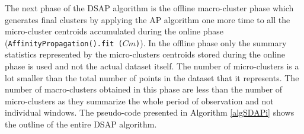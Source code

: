 \documentclass[../UNBThesis2.tex]{subfiles}
\begin{document}
The next phase of the DSAP algorithm is the offline macro-cluster phase which generates final clusters by applying the AP algorithm one more time to all the micro-cluster centroids accumulated during the online phase (\texttt{AffinityPropagation().fit ($Cm$)}). In the offline phase only the summary statistics represented by the micro-clusters centroids stored during the online phase is used and not the actual dataset itself. The number of micro-clusters is a lot smaller than the total number of points in the dataset that it represents. The number of macro-clusters obtained in this phase are less than the number of micro-clusters as they summarize the whole period of observation and not individual windows. The pseudo-code presented in Algorithm \ref{algSDAPi} shows the outline of the entire DSAP algorithm. 

\end{document}
